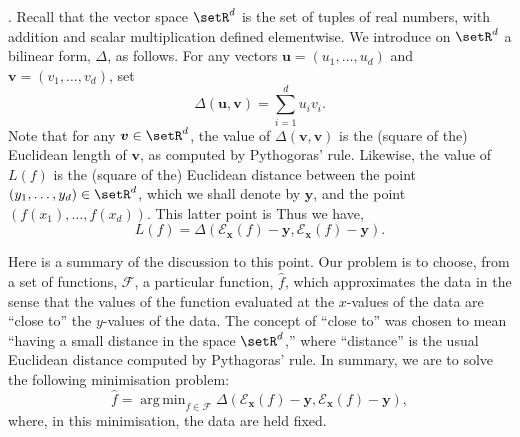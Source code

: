 \documentclass[10pt, a4paper]{article}
\DeclareMathOperator*{\argmin}{arg\,min}
\begin{document}
. Recall that
the vector space $\setR^d$ is the set of tuples of real numbers, with
addition and scalar multiplication defined elementwise. We introduce
on $\setR^d$ a bilinear form, $\Delta$, as follows. For any vectors
$\bm{u} = (u_1,\dotsc,u_d)$ and $\bm{v}=(v_1,\dotsc,v_d)$, set
\[
  \Delta(\bm{u}, \bm{v}) = \sum_{i=1}^d u_iv_i.
\]
Note that for any $\bm{v}\in\setR^d$, the value of
$\Delta(\bm{v}, \bm{v})$ is the (square of the) Euclidean length of
$\bm{v}$, as computed by Pythogoras' rule. Likewise, the value of
$L(f)$ is the (square of the) Euclidean distance between the point
$(y_1, \dotsc, y_d)\in\setR^d$, which we shall denote by $\bm{y}$, and
the point $(f(x_1), \dotsc, f(x_d))$. This latter point is
Thus we have,
\begin{equation}
  L(f) = \Delta(\mathcal{E}_{\bm{x}}(f) - \bm{y}, \mathcal{E}_{\bm{x}}(f) - \bm{y}).
\end{equation}

Here is a summary of the discussion to this point. Our problem is to
choose, from a set of functions, $\mathcal{F}$, a particular function,
$\hat{f}$, which approximates the data in the sense that the values of
the function evaluated at the $x$-values of the data are “close to”
the $y$-values of the data. The concept of “close to” was chosen to
mean “having a small distance in the space $\setR^d$,” where
“distance” is the usual Euclidean distance computed by Pythagoras'
rule. In summary, we are to solve the following minimisation problem:
\begin{equation}
  \label{eq:least-squares-loss}
  \hat{f} = \argmin_{f\in\mathcal{F}} \Delta(\mathcal{E}_{\bm{x}}(f) - \bm{y}, \mathcal{E}_{\bm{x}}(f) - \bm{y}),
\end{equation}
where, in this minimisation, the data are held fixed.
\end{document}
